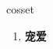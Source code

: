
\begin{frame}
{\huge cosset}
\begin{center}
\begin{enumerate}\Large
  \item \textbf{宠爱}
\end{enumerate}
\end{center}
\end{frame}
